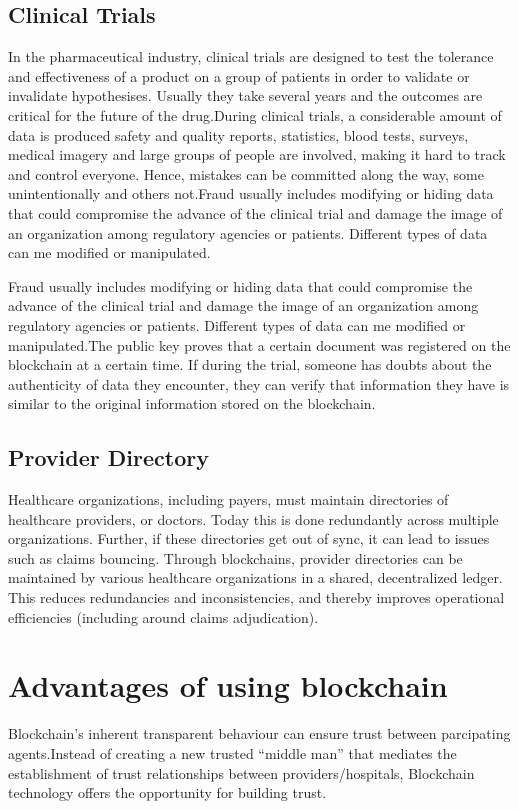\documentclass[12pt]{report}
\begin{document}
\section{Clinical Trials}
In the pharmaceutical industry, clinical trials are designed to test the tolerance and effectiveness of a product on a group of patients in order to validate or invalidate hypothesises. Usually they take several years and the outcomes are critical for the future of the drug.During clinical trials, a considerable amount of data is produced safety and quality reports, statistics, blood tests, surveys, medical imagery and large groups of people are involved, making it hard to track and control everyone\cite{17}. Hence, mistakes can be committed along the way, some unintentionally and others not.Fraud usually includes modifying or hiding data that could compromise the advance of the clinical trial and damage the image of an organization among regulatory agencies or patients. Different types of data can me modified or manipulated.
\par Fraud usually includes modifying or hiding data that could compromise the advance of the clinical trial and damage the image of an organization among regulatory agencies or patients. Different types of data can me modified or manipulated.The public key proves that a certain document was registered on the blockchain at a certain time. If during the trial, someone has doubts about the authenticity of data they encounter, they can verify that information they have is similar to the original information stored on the blockchain.

\section{Provider Directory}
Healthcare organizations, including payers, must maintain directories of healthcare providers, or doctors. Today this is done redundantly across multiple organizations. Further, if these directories get out of sync, it can lead to issues such as claims bouncing. Through blockchains, provider directories can be maintained by various healthcare organizations in a shared, decentralized ledger. This reduces redundancies and inconsistencies, and thereby improves operational efficiencies (including around claims adjudication).




\chapter{Advantages of using blockchain}
Blockchain's inherent transparent behaviour can ensure trust between parcipating agents.Instead of creating a new trusted “middle man” that mediates the establishment of
trust relationships between providers/hospitals, Blockchain technology offers the opportunity
for building trust.
\end{document}
